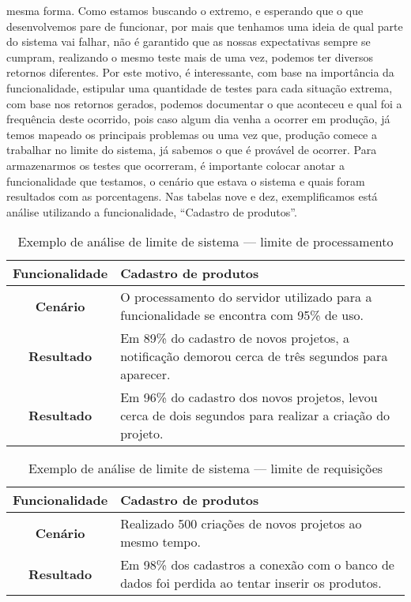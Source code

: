       mesma forma. Como estamos buscando o extremo, e esperando que o que desenvolvemos
      pare de funcionar, por mais que tenhamos uma ideia de qual parte do sistema
      vai falhar, não é garantido que as nossas expectativas sempre se cumpram,
      realizando o mesmo teste mais de uma vez, podemos ter diversos retornos
      diferentes. Por este motivo, é interessante, com base na importância da
      funcionalidade, estipular uma quantidade de testes para cada situação extrema,
      com base nos retornos gerados, podemos documentar o que aconteceu e qual foi
      a frequência deste ocorrido, pois caso algum dia venha a ocorrer em produção,
      já temos mapeado os principais problemas ou uma vez que, produção comece a
      trabalhar no limite do sistema, já sabemos o que é provável de ocorrer.
      Para armazenarmos os testes que ocorreram, é importante colocar anotar a
      funcionalidade que testamos, o cenário que estava o sistema e quais foram
      resultados com as porcentagens. Nas tabelas nove e dez, exemplificamos está análise
      utilizando a funcionalidade, “Cadastro de produtos”. \newline

      \begin{table}[h!]
        \centering
        \begin{tabular}{|c|p{10cm}|}
          \hline
          \textbf{Funcionalidade} &
          Cadastro de produtos \\ \hline
          \textbf{Cenário} &
          O processamento do servidor utilizado para a funcionalidade se encontra
          com 95\% de uso. \\ \hline
          \textbf{Resultado} &
          Em 89\% do cadastro de novos projetos, a notificação demorou cerca de
          três segundos para aparecer. \\ \hline
          \textbf{Resultado} &
          Em 96\% do cadastro dos novos projetos, levou cerca de dois
          segundos para realizar a criação do projeto. \\ \hline
        \end{tabular}
        \caption{Exemplo de análise de limite de sistema — limite de processamento}
        \label{Tabela:9}
      \end{table}

      \begin{table}[h!]
        \centering
        \begin{tabular}{|c|p{10cm}|}
          \hline
          \textbf{Funcionalidade} &
          Cadastro de produtos \\ \hline
          \textbf{Cenário} &
          Realizado 500 criações de novos projetos ao mesmo tempo. \\ \hline
          \textbf{Resultado} &
          Em 98\% dos cadastros a conexão com o banco de dados foi perdida ao tentar
          inserir os produtos. \\ \hline
        \end{tabular}
        \caption{Exemplo de análise de limite de sistema — limite de requisições}
        \label{Tabela:10}
      \end{table}

